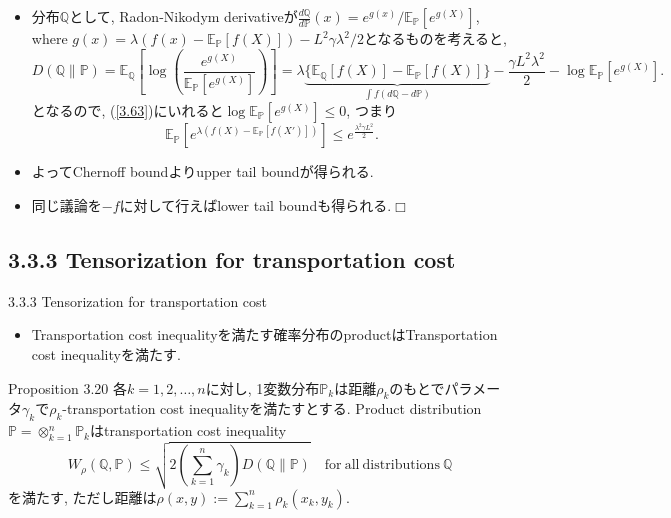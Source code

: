 \documentclass[aspectratio=169, dvipdfmx]{beamer}
\def\qed{\hfill $\Box$}
\newcommand{\ex}{\mathbb{E}}
\newcommand{\bb}{\mathbb}
\begin{document}
\begin{frame}
\begin{itemize}
    \item 分布$\bb{Q}$として,
    Radon-Nikodym derivativeが$\frac{d\bb{Q}}{d\bb{P}}(x) = e^{g(x)}/\ex_{\bb{P}}[e^{g(X)}]$,
    where $g(x) = \lambda (f(x)-\ex_{\bb{P}}[f(X)]) - L^2\gamma \lambda^2 /2$となるものを考えると,
    \[
        D(\bb{Q}\|\bb{P})
        = \ex_{\bb{Q}}\left[\log\left(\frac{e^{g(X)}}{\ex_\bb{P}[e^{g(X)}]}\right)\right]
        = \lambda \underbrace{\{\ex_\bb{Q}[f(X)] - \ex_\bb{P}[f(X)]\}}_{\int f (d\bb{Q}-d\bb{P})} - \frac{\gamma L^2 \lambda^2}{2} - \log \ex_{\bb{P}}[e^{g(X)}].
    \]
    となるので, (\ref{3.63})にいれると$\log \ex_{\bb{P}} [e^{g(X)}] \le 0$, つまり
    \[  \ex_{\bb{P}}[e^{\lambda(f(X) - \ex_{\bb{P}}[f(X')])}] \le e^{\frac{\lambda^2 \gamma L^2}{2}}.\]
    \item よってChernoff boundよりupper tail boundが得られる.
    \item 同じ議論を$-f$に対して行えばlower tail boundも得られる.\qed
\end{itemize}
\end{frame}

\subsection{3.3.3 Tensorization for transportation cost}
\begin{frame}{3.3.3 Tensorization for transportation cost}
\begin{itemize}
    \item Transportation cost inequalityを満たす確率分布のproductはTransportation cost inequalityを満たす.
\end{itemize}
\begin{block}{Proposition 3.20}
    各$k=1,2,\dots,n$に対し, 1変数分布$\bb{P}_k$は距離$\rho_k$のもとでパラメータ$\gamma_k$で$\rho_k$-transportation cost inequalityを満たすとする.
    Product distribution $\bb{P} = \otimes_{k=1}^n \bb{P}_k$はtransportation cost inequality
    \[
        W_\rho(\bb{Q}, \bb{P}) \le \sqrt{2 \left(\sum_{k=1}^n \gamma_k\right) D(\bb{Q}\| \bb{P})}
        \quad \mathrm{for\ all\ distributions\ } \bb{Q}
        \tag{3.64}\label{3.64}
    \]
    を満たす, ただし距離は$\rho(x, y) := \sum_{k=1}^n \rho_k(x_k, y_k)$.
\end{block}
\end{frame}
\end{document}
